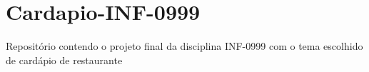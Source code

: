 \chapter{Cardapio-\/\+INF-\/0999}
\hypertarget{md__r_e_a_d_m_e}{}\label{md__r_e_a_d_m_e}
\label{md__r_e_a_d_m_e_autotoc_md0}%
%
Repositório contendo o projeto final da disciplina INF-\/0999 com o tema escolhido de cardápio de restaurante 